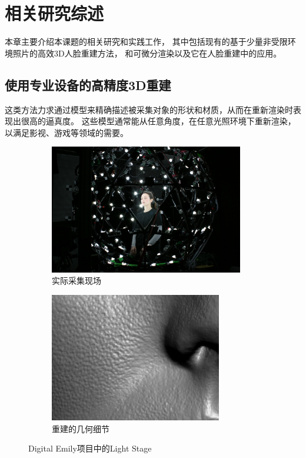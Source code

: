\chapter{相关研究综述}
\label{chap:related_work}

本章主要介绍本课题的相关研究和实践工作，
其中包括现有的基于少量非受限环境照片的高效3D人脸重建方法，
和可微分渲染以及它在人脸重建中的应用。

\section{使用专业设备的高精度3D重建}

这类方法力求通过模型来精确描述被采集对象的形状和材质，从而在重新渲染时表现出很高的逼真度。
这些模型通常能从任意角度，在任意光照环境下重新渲染，以满足影视、游戏等领域的需要。

\begin{figure}
\centering
\begin{subfigure}[b]{0.53\textwidth}
    \centering
    \includegraphics[height=160pt]{figures/light_stage}
    \caption{实际采集现场}
\end{subfigure}%
\begin{subfigure}[b]{0.47\textwidth}
    \centering
    \includegraphics[height=160pt]{figures/emily_detail_1}
    \caption{重建的几何细节}
\end{subfigure}
\caption[Digital Emily 项目中的 Light Stage]{Digital Emily项目中的Light Stage\cite{DEP}}
\end{figure}

